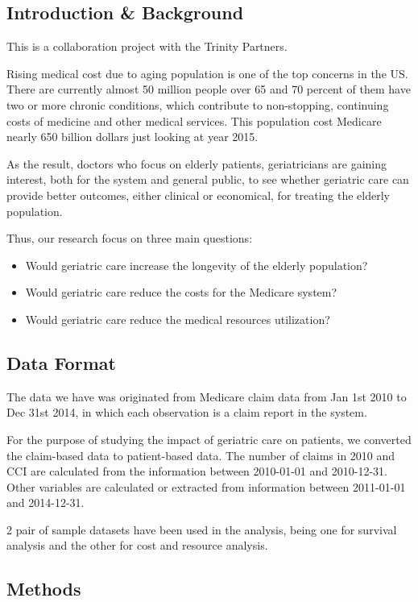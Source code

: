 \documentclass{article}
\begin{document}
	\subsection{Introduction \& Background} 
	This is a collaboration project with the Trinity Partners. 
	
	Rising medical cost due to aging population is one of the top concerns in the US.  There are currently almost 50 million people over 65 and 70 percent of them have two or more chronic conditions, which contribute to non-stopping, continuing costs of medicine and other medical services. This population cost Medicare nearly 650 billion dollars just looking at year 2015.  
	
	As the result, doctors who focus on elderly patients, geriatricians are gaining interest, both for the system and general public, to see whether geriatric care can provide better outcomes, either clinical or economical, for treating the elderly population. 
	
	Thus, our research focus on three main questions: 
	\begin{itemize}
		\item Would geriatric care increase the longevity of the elderly population? 
		\item Would geriatric care reduce the costs for the Medicare system?
		\item Would geriatric care reduce the medical resources utilization?
	\end{itemize}
	   	
	\subsection{Data Format}
	The data we have was originated from Medicare claim data from Jan 1st 2010 to Dec 31st 2014, in which each observation is a claim report in the system. 
	
    For the purpose of studying the impact of geriatric care on patients, we converted the claim-based data to patient-based data. The number of claims in 2010 and CCI are calculated from the information between 2010-01-01 and 2010-12-31. Other variables are calculated or extracted from information between 2011-01-01 and 2014-12-31. 
    
    2 pair of sample datasets have been used in the analysis, being one for survival analysis and the other for cost and resource analysis.

	
	\subsection{Methods}
\end{document}
